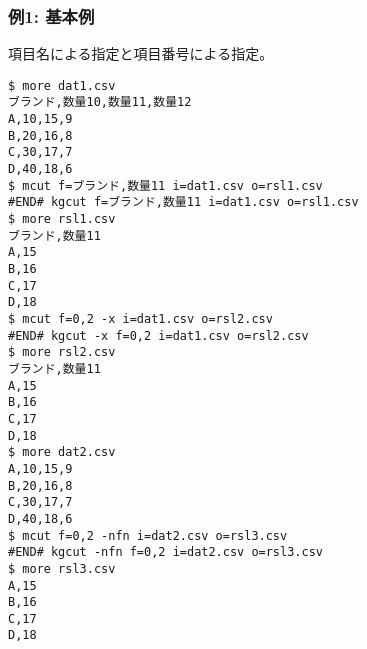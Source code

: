 \subsubsection*{例1: 基本例}

項目名による指定と項目番号による指定。


\begin{Verbatim}[baselinestretch=0.7,frame=single]
$ more dat1.csv
ブランド,数量10,数量11,数量12
A,10,15,9
B,20,16,8
C,30,17,7
D,40,18,6
$ mcut f=ブランド,数量11 i=dat1.csv o=rsl1.csv
#END# kgcut f=ブランド,数量11 i=dat1.csv o=rsl1.csv
$ more rsl1.csv
ブランド,数量11
A,15
B,16
C,17
D,18
$ mcut f=0,2 -x i=dat1.csv o=rsl2.csv
#END# kgcut -x f=0,2 i=dat1.csv o=rsl2.csv
$ more rsl2.csv
ブランド,数量11
A,15
B,16
C,17
D,18
$ more dat2.csv
A,10,15,9
B,20,16,8
C,30,17,7
D,40,18,6
$ mcut f=0,2 -nfn i=dat2.csv o=rsl3.csv
#END# kgcut -nfn f=0,2 i=dat2.csv o=rsl3.csv
$ more rsl3.csv
A,15
B,16
C,17
D,18
\end{Verbatim}
